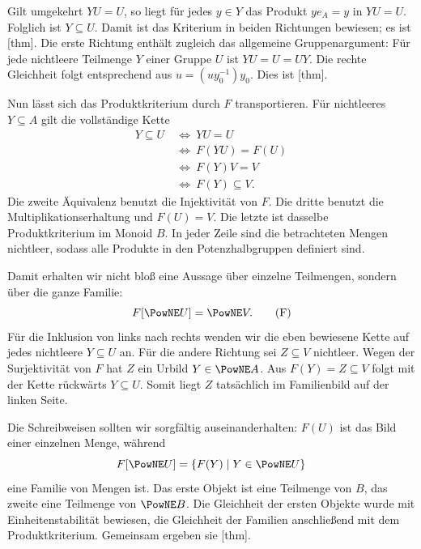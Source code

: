 Gilt umgekehrt \(YU=U\), so liegt für jedes \(y\in Y\)
das Produkt \(ye_A=y\) in \(YU=U\). Folglich ist
\(Y\subseteq U\). Damit ist das Kriterium in beiden
Richtungen bewiesen; es ist
[thm].
Die erste Richtung enthält zugleich das allgemeine
Gruppenargument: Für jede nichtleere Teilmenge \(Y\) einer
Gruppe \(U\) ist \(YU=U=UY\). Die rechte Gleichheit folgt
entsprechend aus \(u=(uy_0^{-1})y_0\). Dies ist
[thm].

Nun lässt sich das Produktkriterium durch \(F\) transportieren.
Für nichtleeres \(Y\subseteq A\) gilt die vollständige Kette
\[
  \begin{aligned}
    Y\subseteq U
      &\ \Longleftrightarrow\ YU=U\\
      &\ \Longleftrightarrow\ F(YU)=F(U)\\
      &\ \Longleftrightarrow\ F(Y)V=V\\
      &\ \Longleftrightarrow\ F(Y)\subseteq V.
  \end{aligned}
\]
Die zweite Äquivalenz benutzt die Injektivität von \(F\).
Die dritte benutzt die Multiplikationserhaltung und
\(F(U)=V\). Die letzte ist dasselbe Produktkriterium im
Monoid \(B\). In jeder Zeile sind die betrachteten Mengen
nichtleer, sodass alle Produkte in den Potenzhalbgruppen
definiert sind.

Damit erhalten wir nicht bloß eine Aussage über einzelne
Teilmengen, sondern über die ganze Familie:
\begin{equation}
  F[\PowNE U]=\PowNE V.
  \tag{F}\label{reconstruction-reading-family}
\end{equation}
Für die Inklusion von links nach rechts wenden wir die eben
bewiesene Kette auf jedes nichtleere \(Y\subseteq U\) an.
Für die andere Richtung sei \(Z\subseteq V\) nichtleer.
Wegen der Surjektivität von \(F\) hat \(Z\) ein Urbild
\(Y\in\PowNE A\). Aus \(F(Y)=Z\subseteq V\) folgt mit
der Kette rückwärts \(Y\subseteq U\). Somit liegt \(Z\)
tatsächlich im Familienbild auf der linken Seite.

Die Schreibweisen sollten wir sorgfältig auseinanderhalten:
\(F(U)\) ist das Bild einer einzelnen Menge, während
\[
  F[\PowNE U]=\{F(Y)\mid Y\in\PowNE U\}
\]
eine Familie von Mengen ist. Das erste Objekt ist eine
Teilmenge von \(B\), das zweite eine Teilmenge von
\(\PowNE B\). Die Gleichheit der ersten
Objekte wurde mit Einheitenstabilität bewiesen, die Gleichheit der
Familien anschließend mit dem Produktkriterium. Gemeinsam
ergeben sie
[thm].

